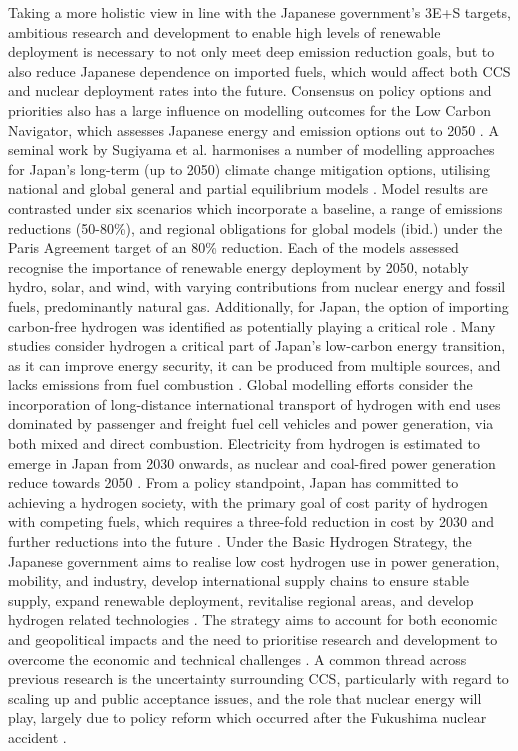 Taking a more holistic view in line with the Japanese government's 3E+S targets, ambitious research and development to enable high levels of renewable deployment is necessary to not only meet deep emission reduction goals, but to also reduce Japanese dependence on imported fuels, which would affect both CCS and nuclear deployment rates into the future. Consensus on policy options and priorities also has a large influence on modelling outcomes for the Low Carbon Navigator, which assesses Japanese energy and emission options out to 2050 \cite{moinuddin_japan_2019}. A seminal work by Sugiyama et al. harmonises a number of modelling approaches for Japan's long-term (up to 2050) climate change mitigation options, utilising national and global general and partial equilibrium models \cite{sugiyama_japans_2019}. Model results are contrasted under six scenarios which incorporate a baseline, a range of emissions reductions (50-80\%), and regional obligations for global models (ibid.) under the Paris Agreement target of an 80\% reduction. Each of the models assessed recognise the importance of renewable energy deployment by 2050, notably hydro, solar, and wind, with varying contributions from nuclear energy and fossil fuels, predominantly natural gas. Additionally, for Japan, the option of importing carbon-free hydrogen was identified as potentially playing a critical role \cite{akimoto_estimates_2010, matsuo_global_2013, oshiro_diffusion_2015, sugiyama_japans_2019}. Many studies consider hydrogen a critical part of Japan's low-carbon energy transition, as it can improve energy security, it can be produced from multiple sources, and lacks emissions from fuel combustion \cite{iida_hydrogen_2019}. Global modelling efforts consider the incorporation of long-distance international transport of hydrogen with end uses dominated by passenger and freight fuel cell vehicles and power generation, via both mixed and direct combustion. Electricity from hydrogen is estimated to emerge in Japan from 2030 onwards, as nuclear and coal-fired power generation reduce towards 2050 \cite{ishimoto_significance_2017}. From a policy standpoint, Japan has committed to achieving a hydrogen society, with the primary goal of cost parity of hydrogen with competing fuels, which requires a three-fold reduction in cost by 2030 and further reductions into the future \cite{nagashima_japans_2018}. Under the Basic Hydrogen Strategy, the Japanese government aims to realise low cost hydrogen use in power generation, mobility, and industry, develop international supply chains to ensure stable supply, expand renewable deployment, revitalise regional areas, and develop hydrogen related technologies \cite{noauthor_basic_2017}. The strategy aims to account for both economic and geopolitical impacts and the need to prioritise research and development to overcome the economic and technical challenges \cite{nagashima_japans_2018}. A common thread across previous research is the uncertainty surrounding \gls{CCS}, particularly with regard to scaling up and public acceptance issues, and the role that nuclear energy will play, largely due to policy reform which occurred after the Fukushima nuclear accident \cite{oshiro_mid-century_2019}.

